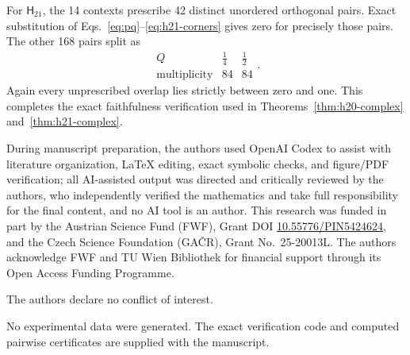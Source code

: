 \documentclass[twocolumn,aps,pra,floatfix,amsmath,amssymb,longbibliography]{revtex4-2}
\theoremstyle{definition}
\theoremstyle{remark}
\newcommand{\Htwentyone}{\mathsf H_{21}}
\begin{document}
For $\Htwentyone$, the 14 contexts prescribe 42 distinct unordered
orthogonal pairs.  Exact substitution of
Eqs.~\eqref{eq:pq}--\eqref{eq:h21-corners} gives zero for
precisely those pairs.  The other 168 pairs split as
\begin{equation}
 \begin{array}{c|cc}
 Q&\frac14&\frac12\\ \hline
 \text{multiplicity}&84&84
 \end{array}.
 \label{eq:H21-Q-table}
\end{equation}
Again every unprescribed overlap lies strictly between zero and one.
This completes the exact faithfulness verification used in
Theorems~\ref{thm:h20-complex} and~\ref{thm:h21-complex}.

\begin{acknowledgments}
During manuscript preparation, the authors used OpenAI Codex to assist with literature organization, LaTeX editing, exact symbolic checks, and figure/PDF verification; all AI-assisted output was directed and critically reviewed by the authors, who independently verified the mathematics and take full responsibility for the final content, and no AI tool is an author.
This research was funded in part by the Austrian
Science Fund (FWF), Grant DOI \href{https://doi.org/10.55776/PIN5424624}{10.55776/PIN5424624}, and the Czech Science
Foundation (GA\v{C}R), Grant No.~25-20013L.
The authors acknowledge FWF and TU Wien Bibliothek for financial support through its Open Access Funding Programme.

The authors declare no conflict of interest.

No experimental data were generated.  The exact verification code and
computed pairwise certificates are supplied with the manuscript.
\end{acknowledgments}


\end{document}
